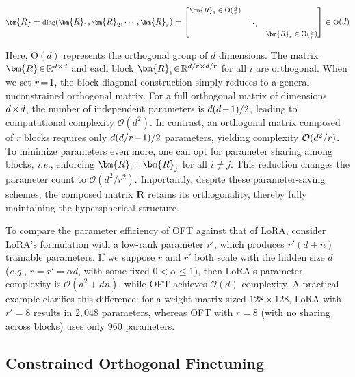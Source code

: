 \begin{equation}
    \footnotesize
    \bm{R}=\text{diag}(\bm{R}_1,\bm{R}_2,\cdots,\bm{R}_r)=\begin{bmatrix}
    \bm{R}_1\in \text{O}(\frac{d}{r}) &  &\\
    &\ddots & \\
    & & \bm{R}_r\in \text{O}(\frac{d}{r})
    \end{bmatrix}\in \text{O}(d)
\end{equation}

Here, $\text{O}(d)$ represents the orthogonal group of $d$ dimensions. The matrix $\thickmuskip=2mu \medmuskip=2mu \bm{R}\in\mathbb{R}^{d\times d}$ and each block $\thickmuskip=2mu \medmuskip=2mu \bm{R}_i\in\mathbb{R}^{d/r\times d/r}$ for all $i$ are orthogonal. When we set $\thickmuskip=2mu \medmuskip=2mu r=1$, the block-diagonal construction simply reduces to a general unconstrained orthogonal matrix. For a full orthogonal matrix of dimensions $\thickmuskip=2mu \medmuskip=2mu d\times d$, the number of independent parameters is $\thickmuskip=2mu \medmuskip=2mu d(d-1)/2$, leading to computational complexity $\mathcal{O}(d^2)$. In contrast, an orthogonal matrix composed of $r$ blocks requires only $\thickmuskip=2mu \medmuskip=2mu d(d/r-1)/2$ parameters, yielding complexity $\thickmuskip=2mu \medmuskip=2mu \mathcal{O}(d^2/r)$. To minimize parameters even more, one can opt for parameter sharing among blocks, \emph{i.e.}, enforcing $\thickmuskip=2mu \medmuskip=2mu\bm{R}_i=\bm{R}_j$ for all $i\neq j$. This reduction changes the parameter count to $\mathcal{O}(d^2/r^2)$. Importantly, despite these parameter-saving schemes, the composed matrix $\bm{R}$ retains its orthogonality, thereby fully maintaining the hyperspherical structure.

To compare the parameter efficiency of OFT against that of LoRA, consider LoRA’s formulation with a low-rank parameter $r'$, which produces $r'(d+n)$ trainable parameters. If we suppose $r$ and $r'$ both scale with the hidden size $d$ (\emph{e.g.}, $r = r' = \alpha d$, with some fixed $0 < \alpha \leq 1$), then LoRA’s parameter complexity is $\mathcal{O}(d^2 + dn)$, while OFT achieves $\mathcal{O}(d)$ complexity. A practical example clarifies this difference: for a weight matrix sized $128 \times 128$, LoRA with $r' = 8$ results in $2,048$ parameters, whereas OFT with $r=8$ (with no sharing across blocks) uses only $960$ parameters.

\subsection{Constrained Orthogonal Finetuning}

